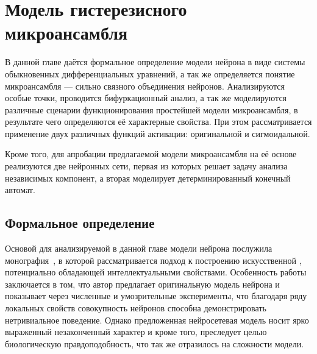 \chapter{Модель гистерезисного микроансамбля} \label{chapter:neuron}

В данной главе даётся формальное определение модели нейрона в виде системы обыкновенных дифференциальных уравнений, а так же определяется понятие микроансамбля --- сильно связного объединения нейронов. Анализируются особые точки, проводится бифуркационный анализ, а так же моделируются различные сценарии функционирования простейшей модели микроансамбля, в результате чего определяются её характерные свойства. При этом рассматривается применение двух различных функций активации: оригинальной и сигмоидальной. 

Кроме того, для апробации предлагаемой модели микроансамбля на её основе реализуются две нейронных сети, первая из которых решает задачу анализа независимых компонент, а вторая моделирует детерминированный конечный автомат. 

\section{Формальное определение} \label{section:neuron_model}


Основой для анализируемой в данной главе модели нейрона послужила монография~\cite{EmelyanovYaroslavsky1990}, в которой рассматривается подход к построению искусственной , потенциально обладающей интеллектуальными свойствами. Особенность работы заключается в том, что автор предлагает оригинальную модель нейрона и показывает через численные и умозрительные эксперименты, что благодаря ряду локальных свойств совокупность нейронов способна демонстрировать нетривиальное поведение. Однако предложенная нейросетевая модель носит ярко выраженный незаконченный характер и кроме того, преследует целью биологическую правдоподобность, что так же отразилось на сложности модели.

